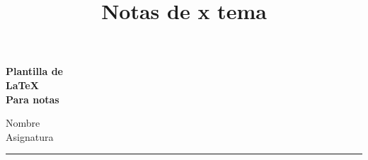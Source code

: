 \documentclass{report}
\title{Notas de x tema}
\begin{document}
\begin{titlepage}
    \colorbox{primary}{
        \parbox[t]{0.93\textwidth}{
            \parbox[t]{0.91\textwidth}{
                \raggedleft
                \fontsize{50pt}{80pt}\selectfont
                \vspace{0.7cm}
                \textbf{
                    \color{white}
                    Plantilla de \\
                    LaTeX \\
                    Para notas \\
                }
                \vspace{0.7cm}
            }
        }
    }

    \vfill


    \parbox[t]{0.93\textwidth}{ %
    \raggedleft %
    \large %
    {\Large Nombre}\\[4pt] %
    Asignatura\\[4pt]
    {\color{primary}
    \hfill\rule{0.2\linewidth}{1pt}%
    }
    }

\end{titlepage}

\tableofcontents




\end{document}
